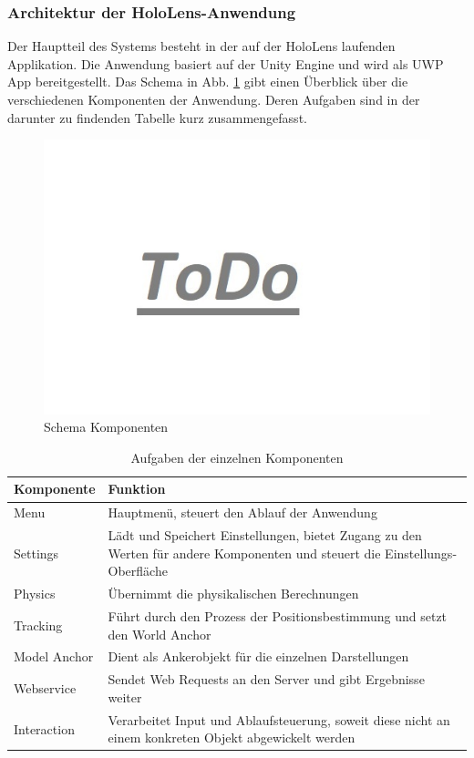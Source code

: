 \subsubsection{Architektur der HoloLens-Anwendung}
Der Hauptteil des Systems besteht in der auf der HoloLens laufenden Applikation. Die Anwendung basiert auf der Unity Engine und wird als UWP App bereitgestellt. Das Schema in Abb. \ref{img:components-schema} gibt einen Überblick über die verschiedenen Komponenten der Anwendung. Deren Aufgaben sind in der darunter zu findenden Tabelle kurz zusammengefasst.

\begin{figure}[h!]
	\centering
	\includegraphics[width=1\textwidth]{images/todo.jpg}
	\caption{Schema Komponenten}
	\label{img:components-schema}
\end{figure}

\setlength\extrarowheight{5pt}
\begin{table}[htb]
	\centering
	\begin{tabular}{m{3cm}|m{10cm}}
		Komponente & Funktion\\
		\hline
		\hline
		Menu & Hauptmenü, steuert den Ablauf der Anwendung\\
		\hline
		Settings & Lädt und Speichert Einstellungen, bietet Zugang zu den Werten für andere Komponenten und steuert die Einstellungs-Oberfläche\\
		\hline
		Physics & Übernimmt die physikalischen Berechnungen\\
		\hline
		Tracking & Führt durch den Prozess der Positionsbestimmung und setzt den World Anchor\\
		\hline
		Model Anchor & Dient als Ankerobjekt für die einzelnen Darstellungen\\
		\hline
		Webservice & Sendet Web Requests an den Server und gibt Ergebnisse weiter\\
		\hline
		Interaction & Verarbeitet Input und Ablaufsteuerung, soweit diese nicht an einem konkreten Objekt abgewickelt werden\\
	\end{tabular}\caption{\label{tab:components-details} Aufgaben der einzelnen Komponenten}
\end{table}



